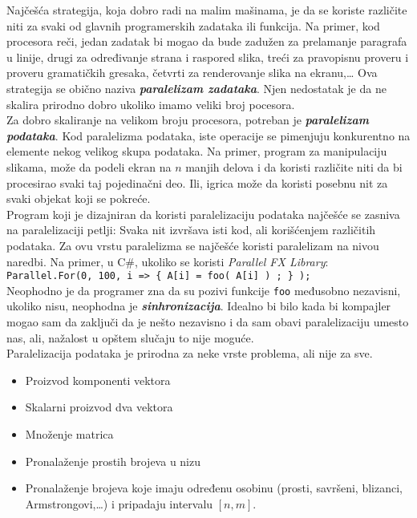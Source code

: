 \documentclass[../main.tex]{subfiles}
\begin{document}
Najčešća strategija, koja dobro radi na malim mašinama, je da se koriste različite niti za svaki od glavnih programerskih zadataka ili funkcija. Na primer, kod procesora reči, jedan zadatak bi mogao da bude zadužen za prelamanje paragrafa u linije, drugi za određivanje strana i raspored slika, treći za pravopisnu proveru i proveru gramatičkih gresaka, četvrti za renderovanje slika na ekranu,\ldots
Ova strategija se obično naziva {\it \bf paralelizam zadataka}. Njen nedostatak je da ne skalira prirodno dobro ukoliko imamo veliki broj pocesora.\\
Za dobro skaliranje na velikom broju procesora, potreban je {\it \bf paralelizam podataka}. Kod paralelizma podataka, iste operacije se pimenjuju konkurentno na elemente nekog velikog skupa podataka. Na primer, program za manipulaciju slikama, može da podeli ekran na $n$ manjih delova i da koristi različite niti da bi procesirao svaki taj pojedinačni deo. Ili, igrica može da koristi posebnu nit za svaki objekat koji se pokreće.
\\
\indent Program koji je dizajniran da koristi paralelizaciju podataka najčešće se zasniva na paralelizaciji petlji: Svaka nit izvršava isti kod, ali korišćenjem različitih podataka. Za ovu vrstu paralelizma se najčešće koristi paralelizam na nivou naredbi. Na primer, u C\#, ukoliko se koristi {\it Parallel FX Library}:
\\ \texttt{Parallel.For(0, 100, i => \{ A[i] = foo( A[i] ) ; \} );}
\\
Neophodno je da programer zna da su pozivi funkcije \texttt{foo} međusobno nezavisni, ukoliko nisu, neophodna je {\it \bf sinhronizacija}. Idealno bi bilo kada bi kompajler mogao sam da zaključi da je nešto nezavisno i da sam obavi paralelizaciju umesto nas, ali, nažalost u opštem slučaju to nije moguće.
\\
Paralelizacija podataka je prirodna za neke vrste problema, ali nije za sve.
\begin{boxprimer}
\begin{itemize}
\item Proizvod komponenti vektora
\item Skalarni proizvod dva vektora
\item Množenje matrica
\item Pronalaženje prostih brojeva u nizu
\item Pronalaženje brojeva koje imaju određenu osobinu (prosti, savršeni, blizanci, Armstrongovi,\ldots) i pripadaju intervalu $[n,m]$.
\end{itemize}
\end{boxprimer}
\end{document}

